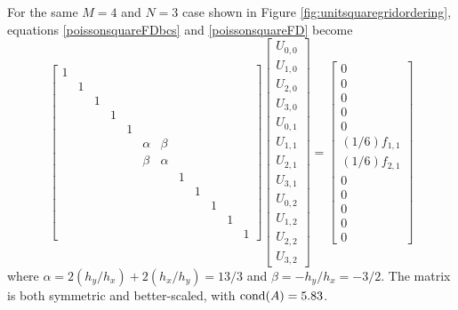 \medskip\noindent\hrulefill
\begin{example} For the same $M=4$ and $N=3$ case shown in Figure \ref{fig:unitsquaregridordering}, equations \eqref{poissonsquareFDbcs} and \eqref{poissonsquareFD} become
\begin{equation*}
\begin{bmatrix}
1 &  &  &  &  &  &  &  &  &  &  &  \\
  & 1&  &  &  &  &  &  &  &  &  &  \\
  &  & 1&  &  &  &  &  &  &  &  &  \\
  &  &  & 1&  &  &  &  &  &  &  &  \\
  &  &  &  & 1&  &  &  &  &  &  &  \\
  &  &  &  &  & \alpha& \beta&  &  &  &  &  \\
  &  &  &  &  & \beta& \alpha&  &  &  &  &  \\
  &  &  &  &  &  &  & 1&  &  &  &  \\
  &  &  &  &  &  &  &  & 1&  &  &  \\
  &  &  &  &  &  &  &  &  & 1&  &  \\
  &  &  &  &  &  &  &  &  &  & 1&  \\
  &  &  &  &  &  &  &  &  &  &  & 1
\end{bmatrix}
\begin{bmatrix}
U_{0,0} \\
U_{1,0} \\
U_{2,0} \\
U_{3,0} \\
U_{0,1} \\
U_{1,1} \\
U_{2,1} \\
U_{3,1} \\
U_{0,2} \\
U_{1,2} \\
U_{2,2} \\
U_{3,2}
\end{bmatrix}
=
\begin{bmatrix}
0 \\
0 \\
0 \\
0 \\
0 \\
(1/6) f_{1,1} \\
(1/6) f_{2,1} \\
0 \\
0 \\
0 \\
0 \\
0
\end{bmatrix}
\end{equation*}
where $\alpha = 2 (h_y/h_x) + 2 (h_x/h_y) = 13/3$ and $\beta = - h_y/h_x = - 3/2$.  The matrix is both symmetric and better-scaled, with $\operatorname{cond}(A)=5.83$.
\end{example}
\noindent\hrulefill


